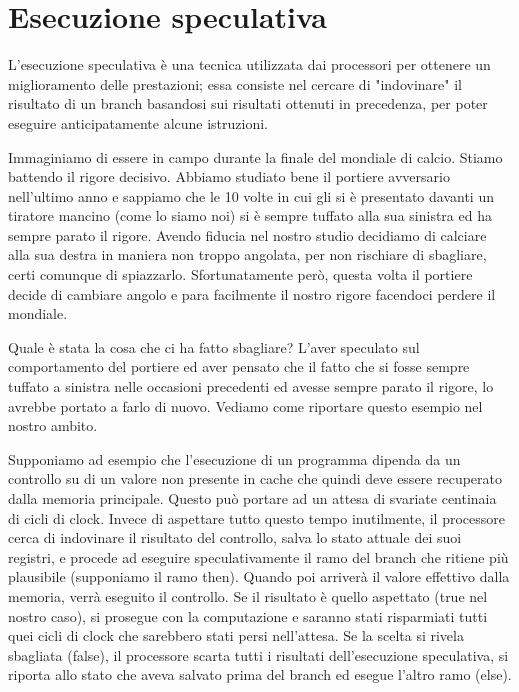 	\section{Esecuzione speculativa}
		L'esecuzione speculativa è una tecnica utilizzata dai processori per ottenere un miglioramento delle prestazioni; essa consiste nel cercare di "indovinare" il risultato di un branch basandosi sui risultati ottenuti in precedenza, per poter eseguire anticipatamente alcune istruzioni.
		
		Immaginiamo di essere in campo durante la finale del mondiale di calcio. Stiamo battendo il rigore decisivo. Abbiamo studiato bene il portiere avversario nell'ultimo anno e sappiamo che le 10 volte in cui gli si è presentato davanti un tiratore mancino (come lo siamo noi) si è sempre tuffato alla sua sinistra ed ha sempre parato il rigore. Avendo fiducia nel nostro studio decidiamo di calciare alla sua destra in maniera non troppo angolata, per non rischiare di sbagliare, certi comunque di spiazzarlo. Sfortunatamente però, questa volta il portiere decide di cambiare angolo e para facilmente il nostro rigore facendoci perdere il mondiale.
		
		Quale è stata la cosa che ci ha fatto sbagliare? L'aver speculato sul comportamento del portiere ed aver pensato che il fatto che si fosse sempre tuffato a sinistra nelle occasioni precedenti ed avesse sempre parato il rigore, lo avrebbe portato a farlo di nuovo. Vediamo come riportare questo esempio nel nostro ambito. 
		
		Supponiamo ad esempio che l'esecuzione di un programma dipenda da un controllo su di un valore non presente in cache che quindi deve essere recuperato dalla memoria principale. Questo può portare ad un attesa di svariate centinaia di cicli di clock. Invece di aspettare tutto questo tempo inutilmente, il processore cerca di indovinare il risultato del controllo, salva lo stato attuale dei suoi registri, e procede ad eseguire speculativamente il ramo del branch che ritiene più plausibile (supponiamo il ramo then). Quando poi arriverà il valore effettivo dalla memoria, verrà eseguito il controllo. Se il risultato è quello aspettato (true nel nostro caso), si prosegue con la computazione e saranno stati risparmiati tutti quei cicli di clock che sarebbero stati persi nell'attesa. Se la scelta si rivela sbagliata (false), il processore scarta tutti i risultati dell'esecuzione speculativa, si riporta allo stato che aveva salvato prima del branch ed esegue l'altro ramo (else).
		

